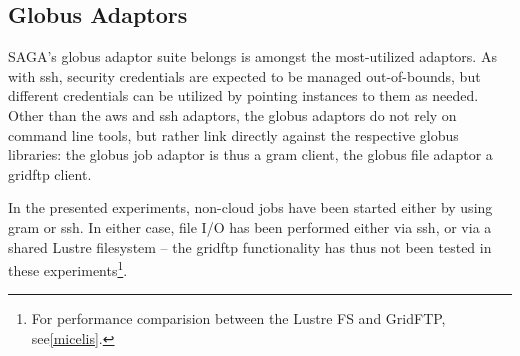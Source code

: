  \subsection{Globus Adaptors}

  SAGA's globus adaptor suite belongs is amongst the most-utilized
  adaptors.  As with ssh, security credentials are expected to be
  managed out-of-bounds, but different credentials can be utilized by
  pointing  instances to them as needed.  Other than
  the aws and ssh adaptors, the globus adaptors do not rely on command
  line tools, but rather link directly against the respective globus
  libraries: the globus job adaptor is thus a gram client, the globus
  file adaptor a gridftp client.

  In the presented experiments, non-cloud jobs have been started
  either by using gram or ssh.  In either case, file I/O has been
  performed either via ssh, or via a shared Lustre filesystem -- the
  gridftp functionality has thus not been tested in these
  experiments\footnote{For performance comparision between the Lustre
  FS and GridFTP, see\ref{micelis}.}.


